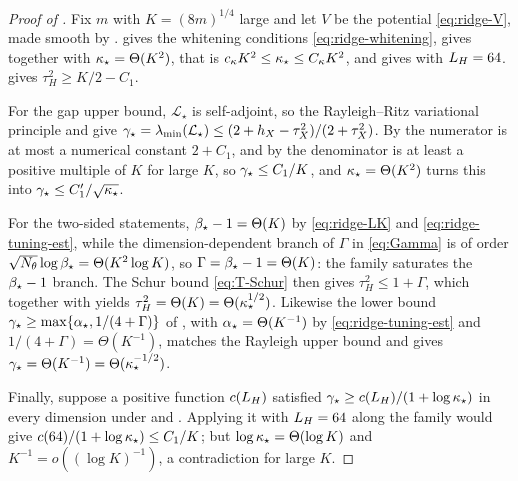 \begin{proof}[Proof of ]
Fix $m$ with $K=(8m)^{1/4}$ large and let $V$ be the potential \eqref{eq:ridge-V}, made smooth
by .  gives the whitening conditions
\eqref{eq:ridge-whitening},  gives 
together with $\kappa_\star=\Theta(K^2)$, that is $c_\kappa K^2\leq\kappa_\star\leq C_\kappa K^2$, and
 gives  with $L_H=64$.
 gives $\tau_H^2\geq K/2-C_1$.

For the gap upper bound, $\mathcal L_\star$ is self-adjoint, so the Rayleigh--Ritz variational
principle and  give
$\gamma_\star=\lambda_{\min}(\mathcal L_\star)\leq(2+h_X-\tau_X^2)/(2+\tau_X^2)$. By
 the numerator is at most a numerical constant $2+C_1$, and by
 the denominator is at least a positive multiple of $K$ for large $K$,
so $\gamma_\star\leq C_1/K$, and $\kappa_\star=\Theta(K^2)$ turns this into
$\gamma_\star\leq C_1'/\sqrt{\kappa_\star}$.

For the two-sided statements, $\beta_\star-1=\Theta(K)$ by \eqref{eq:ridge-LK} and
\eqref{eq:ridge-tuning-est}, while the dimension-dependent branch of $\Gamma$ in
\eqref{eq:Gamma} is of order $\sqrt{N_\theta}\log\beta_\star=\Theta(K^2\log K)$, so
$\Gamma=\beta_\star-1=\Theta(K)$: the family saturates the $\beta_\star-1$ branch. The Schur bound
\eqref{eq:T-Schur} then gives $\tau_H^2\leq1+\Gamma$, which together with
 yields
$\tau_H^2=\Theta(K)=\Theta(\kappa_\star^{1/2})$. Likewise the lower bound
$\gamma_\star\geq\max\{\alpha_\star,1/(4+\Gamma)\}$ of , with
$\alpha_\star=\Theta(K^{-1})$ by \eqref{eq:ridge-tuning-est} and $1/(4+\Gamma)=\Theta(K^{-1})$,
matches the Rayleigh upper bound and gives
$\gamma_\star=\Theta(K^{-1})=\Theta(\kappa_\star^{-1/2})$.

Finally, suppose a positive function $c(L_H)$ satisfied
$\gamma_\star\geq c(L_H)/(1+\log\kappa_\star)$ in every dimension under
 and . Applying it with $L_H=64$ along the
family would give $c(64)/(1+\log\kappa_\star)\leq C_1/K$; but $\log\kappa_\star=\Theta(\log K)$ and
$K^{-1}=o((\log K)^{-1})$, a contradiction for large $K$.
\end{proof}

